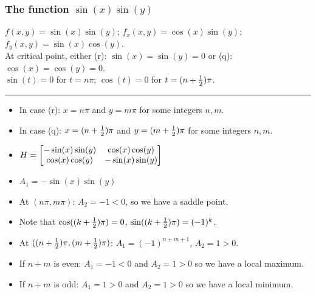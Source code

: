 \documentclass[9pt]{beamer}
\begin{document}
\begin{frame}[t]
 \frametitle{The function $\sin(x)\sin(y)$}
 $f(x,y)=\sin(x)\sin(y)$;
 $f_x(x,y)=\cos(x)\sin(y)$;
 $f_y(x,y)=\sin(x)\cos(y)$. \\
 At critical point, either (r): $\sin(x)=\sin(y)=0$ or 
 (q): $\cos(x)=\cos(y)=0$. \\
 $\sin(t)=0$ for $t=n\pi$; $\cos(t)=0$ for $t=(n+\tfrac{1}{2})\pi$. \\[1ex]
 \hrule
 \vspace{1ex}
 \begin{itemize}
  \item<2-> In case (r): $x=n\pi$ and $y=m\pi$ for some integers $n,m$. 
  \item<3-> In case (q): $x=(n+\tfrac{1}{2})\pi$ and $y=(m+\tfrac{1}{2})\pi$ for
   some integers $n,m$.
  \item<4-> $H=\left[\begin{matrix} -\sin(x)\sin(y)&\cos(x)\cos(y) \\
                    \cos(x)\cos(y)&-\sin(x)\sin(y) \end{matrix}\right]
            $
  \item<5->{$A_1=-\sin(x)\sin(y)$}
  \item<7-> At $(n\pi,m\pi)$: $A_2=-1<0$, so we have a saddle point.
  \item<8-> Note that $\cos((k+\tfrac{1}{2})\pi)=0$, $\sin((k+\tfrac{1}{2})\pi)=(-1)^k$.
  \item<9-> At $((n+\tfrac{1}{2})\pi,(m+\tfrac{1}{2})\pi)$: $A_1=(-1)^{n+m+1}$, 
   $A_2=1>0$.
  \item<10-> If $n+m$ is even: $A_1=-1<0$ and $A_2=1>0$ so we have a local maximum.
  \item<11-> If $n+m$ is odd: $A_1=1>0$ and $A_2=1>0$ so we have a local minimum.
 \end{itemize}
\end{frame}
\end{document}
